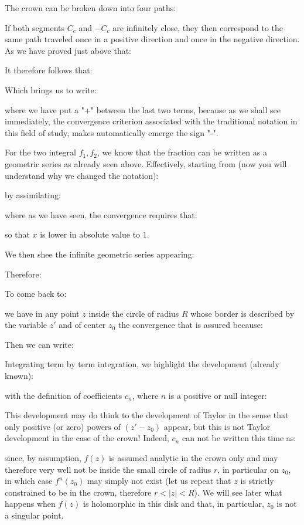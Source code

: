 	The crown can be broken down into four paths:
	
	If both segments $C_c$ and $-C_c$ are infinitely close, they then correspond to the same path traveled once in a positive direction and once in the negative direction. As we have proved just above that:
	
	It therefore follows that:
	
	Which brings us to write:
	
	where we have put a "+" between the last two terms, because as we shall see immediately, the convergence criterion associated with the traditional notation in this field of study, makes automatically emerge the sign "-".
	
	For the two integral $f_1,f_2$, we know that the fraction can be written as a geometric series as already seen above. Effectively, starting from (now you will understand why we changed the notation):
	
	by assimilating:
	
	where as we have seen, the convergence requires that:
	
	so that $x$ is lower in absolute value to $1$.
	
	We then shee the infinite geometric series appearing:
	
	Therefore:
	
	To come back to:
	
	we have in any point $z$ inside the circle of radius $R$ whose border is described by the variable $z'$ and of center $z_0$ the convergence that is assured because:
	
	Then we can write:
	
	Integrating term by term integration, we highlight the development (already known):
	
	with the definition of coefficients $c_n$, where $n$ is a positive or null integer:
	
	This development may do think to the development of Taylor in the sense that only positive (or zero) powers of $(z'-z_0)$ appear, but this is not Taylor development in the case of the crown! Indeed, $c_n$ can not be written this time as:
	
	since, by assumption, $f(z)$ is assumed analytic in the crown only and may therefore very well not be inside the small circle of radius $r$, in particular on $z_0$, in which case $f^{n}(z_0)$ may simply not exist (let us repeat that $z$ is strictly constrained to be in the crown, therefore $r<\vert z \vert <R$). We will see later what happens when $f (z)$ is holomorphic in this disk and that, in particular, $z_0$ is not a singular point.
	
